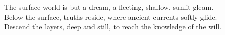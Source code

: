 \documentclass{article}
\begin{document}
\begin{infobox}
The surface world is but a dream, a fleeting, shallow, sunlit gleam.\\
Below the surface, truths reside, where ancient currents softly glide.\\
Descend the layers, deep and still, to reach the knowledge of the will.
\end{infobox}
\end{document}
